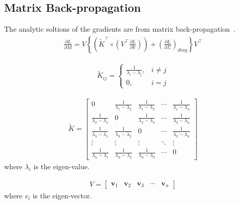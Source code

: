 \documentclass{article}
\newcommand{\bv}{\mathbf{v}}
\begin{document}
	\subsection{Matrix Back-propagation}
	\label{sec: mbp}
	The analytic soltions of the gradients are from matrix back-propagation~\cite{ionescu2015matrix}.
	\begin{equation}
	\begin{aligned}
	\frac{\partial L}{\partial M}=V\left\{\left(\tilde{K}^{\top} \circ\left(V^{\top} \frac{\partial L}{\partial V}\right)\right)+\left(\frac{\partial L}{\partial \Sigma}\right)_{d i a g}\right\} V^{\top}
	\end{aligned}
	\end{equation}
	
	\begin{equation}
	\begin{aligned}
	\tilde{K}_{i j}=\left\{\begin{array}{ll}{\frac{1}{\lambda_{i}-\lambda_{j}},} & {i \neq j} \\ {0,} & {i=j}\end{array}\right.
	\end{aligned}
	\end{equation}
	
	\begin{equation}
	\begin{aligned}
	\tilde{K} = 
	\begin{bmatrix}
	0  &\frac{1}{\lambda_{1} - \lambda_{2}} &\frac{1}{\lambda_{1} - \lambda_{3}} &\cdots &\frac{1}{\lambda_{1} - \lambda_{n}}\\
	\frac{1}{\lambda_{2} - \lambda_{1}} &0 &\frac{1}{\lambda_{2} - \lambda_{3}} &\cdots &\frac{1}{\lambda_{2} - \lambda_{n}}\\
	\frac{1}{\lambda_{3} - \lambda_{1}} &\frac{1}{\lambda_{3} - \lambda_{2}} &0 &\cdots &\frac{1}{\lambda_{3} - \lambda_{n}}\\
	\vdots &\vdots &\vdots &\ddots &\vdots\\
	\frac{1}{\lambda_{n} - \lambda_{1}} &\frac{1}{\lambda_{n} - \lambda_{2}} &\frac{1}{\lambda_{n} - \lambda_{3}} &\cdots &0
	\end{bmatrix}
	\end{aligned}
	\end{equation}
	where $\lambda_{i}$ is the eigen-value.
	
	\begin{equation}
	\begin{aligned}
	V = 
	\begin{bmatrix}
	\bv_{1} &\bv_{2} &\bv_{3} &\cdots &\bv_{n}
	\end{bmatrix}
	\end{aligned}
	\end{equation}
	where $v_{i}$ is the eigen-vector.
	
\end{document}
